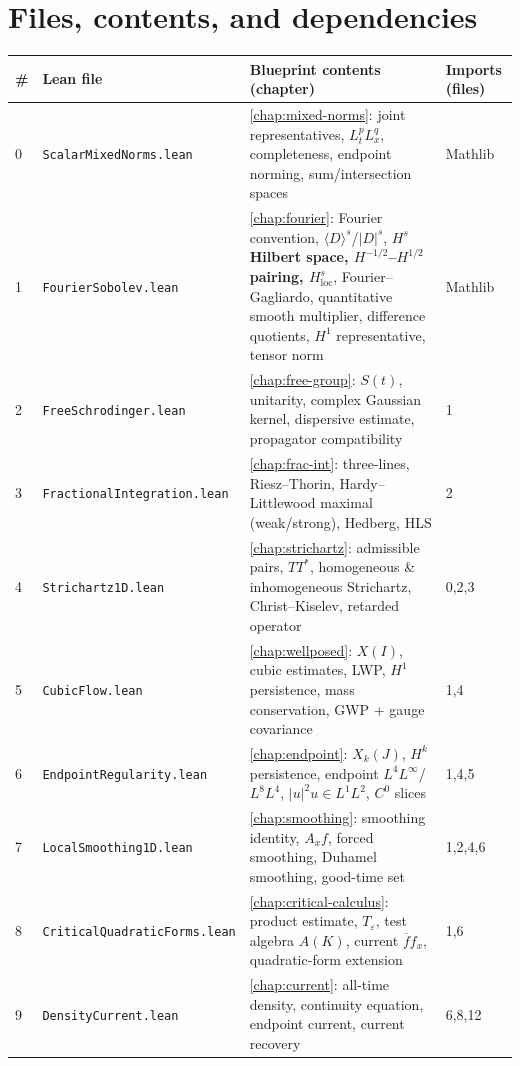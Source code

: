 \documentclass[11pt,oneside]{book}
\theoremstyle{definition}
\theoremstyle{remark}
\newcommand{\1}{\mathbf 1}
\newcommand{\loc}{\mathrm{loc}}
\newcommand{\eps}{\varepsilon}
\begin{document}
\section{Files, contents, and dependencies}
\begin{longtable}{p{}p{}p{}p{}}
\toprule
\# & Lean file & Blueprint contents (chapter) & Imports (files) \\
\midrule\endhead
0  & \texttt{ScalarMixedNorms.lean} & \cref{chap:mixed-norms}: joint representatives, $L^p_tL^q_x$, completeness, endpoint norming, sum/intersection spaces & Mathlib \\
1  & \texttt{FourierSobolev.lean} & \cref{chap:fourier}: Fourier convention, $\langle D\rangle^s$/$|D|^s$, \textbf{$H^{s}$ Hilbert space, $H^{-1/2}$--$H^{1/2}$ pairing, $H^s_\loc$}, Fourier--Gagliardo, quantitative smooth multiplier, difference quotients, $H^1$ representative, tensor norm & Mathlib \\
2  & \texttt{FreeSchrodinger.lean} & \cref{chap:free-group}: $S(t)$, unitarity, complex Gaussian kernel, dispersive estimate, propagator compatibility & 1 \\
3  & \texttt{FractionalIntegration.lean} & \cref{chap:frac-int}: three-lines, Riesz--Thorin, Hardy--Littlewood maximal (weak/strong), Hedberg, HLS & 2 \\
4  & \texttt{Strichartz1D.lean} & \cref{chap:strichartz}: admissible pairs, $TT^*$, homogeneous \& inhomogeneous Strichartz, Christ--Kiselev, retarded operator & 0,2,3 \\
5  & \texttt{CubicFlow.lean} & \cref{chap:wellposed}: $X(I)$, cubic estimates, LWP, $H^1$ persistence, mass conservation, GWP + gauge covariance & 1,4 \\
6  & \texttt{EndpointRegularity.lean} & \cref{chap:endpoint}: $X_k(J)$, $H^k$ persistence, endpoint $L^4L^\infty$/$L^8L^4$, $|u|^2u\in L^1L^2$, $C^0$ slices & 1,4,5 \\
7  & \texttt{LocalSmoothing1D.lean} & \cref{chap:smoothing}: smoothing identity, $A_xf$, forced smoothing, Duhamel smoothing, good-time set & 1,2,4,6 \\
8  & \texttt{CriticalQuadraticForms.lean} & \cref{chap:critical-calculus}: product estimate, $T_\eps$, test algebra $A(K)$, current $\overline f f_x$, quadratic-form extension & 1,6 \\
9  & \texttt{DensityCurrent.lean} & \cref{chap:current}: all-time density, continuity equation, endpoint current, current recovery & 6,8,12 \\

\end{longtable}
\end{document}
